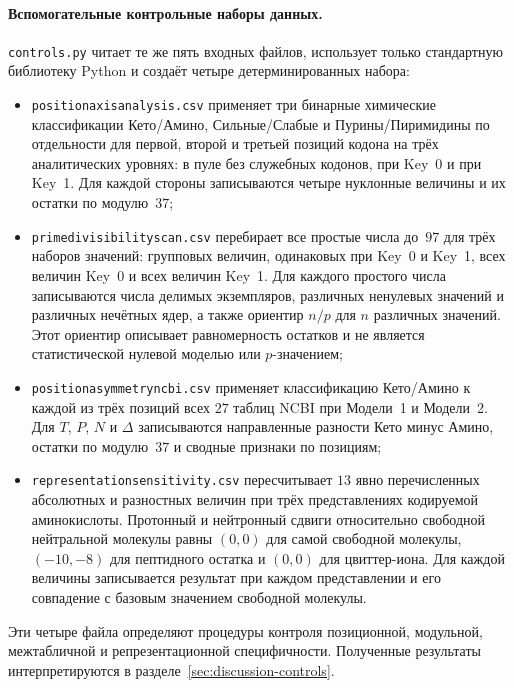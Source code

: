 \documentclass[11pt,a4paper]{article}
\renewcommand{\_}{\origunderscore\allowbreak}
\begin{document}
\paragraph{Вспомогательные контрольные наборы данных.}
\texttt{controls.py} читает те же пять входных файлов, использует
только стандартную библиотеку Python и создаёт четыре
детерминированных набора:
\begin{itemize}
  \item \texttt{position\_axis\_analysis.csv} применяет три
        бинарные химические классификации Кето/Амино,
        Сильные/Слабые и Пурины/Пиримидины по отдельности для первой,
        второй и третьей позиций кодона на трёх аналитических
        уровнях: в пуле без служебных кодонов, при Key~0 и при Key~1.
        Для каждой стороны записываются четыре нуклонные величины
        и их остатки по модулю~$37$;
  \item \texttt{prime\_divisibility\_scan.csv} перебирает все
        простые числа до~$97$ для трёх наборов значений:
        групповых величин, одинаковых при Key~0 и Key~1,
        всех величин Key~0 и всех величин Key~1. Для каждого
        простого числа записываются числа делимых экземпляров,
        различных ненулевых значений и различных нечётных ядер,
        а также ориентир $n/p$ для $n$ различных значений. Этот
        ориентир описывает равномерность остатков и не является
        статистической нулевой моделью или $p$-значением;
  \item \texttt{position\_asymmetry\_ncbi.csv} применяет
        классификацию Кето/Амино к каждой из трёх позиций всех
        $27$ таблиц NCBI при Модели~1 и Модели~2.
        Для $T$, $P$, $N$ и
        $\Delta$ записываются направленные разности Кето минус
        Амино, остатки по модулю~$37$ и сводные признаки по
        позициям;
  \item \texttt{representation\_sensitivity.csv} пересчитывает
        $13$ явно перечисленных абсолютных и разностных
        величин при трёх представлениях кодируемой аминокислоты.
        Протонный и нейтронный сдвиги относительно свободной
        нейтральной молекулы равны $(0,0)$ для самой свободной
        молекулы, $(-10,-8)$ для пептидного остатка и $(0,0)$ для
        цвиттер-иона. Для каждой величины записывается результат при
        каждом представлении и его совпадение с базовым значением
        свободной молекулы.
\end{itemize}
Эти четыре файла определяют процедуры контроля позиционной,
модульной, межтабличной и репрезентационной специфичности.
Полученные результаты интерпретируются в
разделе~\ref{sec:discussion-controls}.
\end{document}
